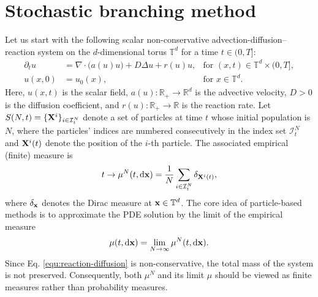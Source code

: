 \documentclass[a4paper,fleqn]{cas-sc}
\newcommand{\mhyphen}{\text{-}}
\theoremstyle{definition}
\theoremstyle{remark}
\begin{document}

\section{Stochastic branching method}
Let us start with the following scalar non-conservative advection-diffusion–reaction system on the $d$-dimensional torus $\mathbb{T}^d$ for a time $t \in (0, T]$:
\begin{subequations}\label{equ:reaction-diffusion}
\begin{align}
\partial_t u &= \nabla \!\cdot\! \big( a(u) u \big) + D \Delta u + r(u) u, & \text{for } (x, t) \in \mathbb{T}^d \times (0, T], \label{equ:pde} \\
u(x, 0) &= u_0(x), & \text{for } x \in \mathbb{T}^d. \label{equ:ic}
\end{align}
\end{subequations}
Here, $u(x,t)$ is the scalar field, $a(u): \mathbb{R}_{+} \to \mathbb{R}^d$ is the advective velocity, $D > 0$ is the diffusion coefficient, and $r(u): \mathbb{R}_{+} \to \mathbb{R}$ is the reaction rate.
Let $S(N,t)=\{\mathbf{X}^i\}_{i\in\mathcal I^N_t}$ denote a set of particles at time $t$ whose initial population is $N$, where the particles' indices are numbered consecutively in the index set $\mathcal I^N_t$ and $\mathbf{X}^i(t)$ denote the position of the $i\mhyphen$th particle. The associated empirical (finite) measure is
\begin{equation}
    t \to \mu^N(t,\mathrm{d} \mathbf{x}) =  \frac{1}{N}\sum_{i\in \mathcal I^N_t}\delta_{\mathbf{X}^i(t)},
\end{equation}
where $\delta_{\mathbf{x}} $ denotes the Dirac measure at $\mathbf{x}\in \mathbb{T}^d$. The core idea of particle-based methods is to approximate the PDE solution by the limit of the empirical measure
\[
\mu(t,\mathrm{d}\mathbf{x}) = \lim_{N\to\infty} \mu^N(t,\mathrm{d}\mathbf{x}).
\]
Since Eq. \eqref{equ:reaction-diffusion} is non-conservative, the total mass of the system is not preserved. Consequently, both $\mu^N$ and its limit $\mu$ should be viewed as finite measures rather than probability measures.
\end{document}
